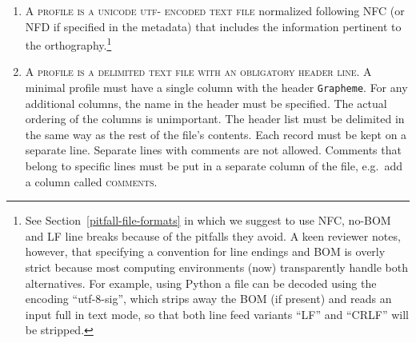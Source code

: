 \begin{enumerate}
	\def\labelenumi{A\arabic{enumi}.} 
	\item \textsc{A profile is a unicode utf-\scalebox{0.8}{8} encoded text file} 
	   normalized following NFC (or NFD if specified in the metadata)
       that includes the information pertinent to the orthography.\footnote{See 
	   Section~\ref{pitfall-file-formats} in which we suggest to use NFC, 
	   no-BOM and LF line breaks because of the pitfalls they avoid. A keen reviewer notes, however, that specifying 
	   a convention for line endings and BOM is overly strict because most 
	   computing environments (now) transparently handle both alternatives. 
	   For example, using Python a file can be decoded using the encoding 
	   ``utf-8-sig'', which strips away the BOM (if present) and reads 
	   an input full in text mode, so that both line feed variants ``LF'' and 
	   ``CRLF'' will be stripped.}

	\item \textsc{A profile is a delimited text file with an obligatory header
       line}. A minimal profile must have a single column with the header \texttt{Grapheme}. 
	   For any additional columns, the name in the header 
       must be specified. The actual ordering of the columns is unimportant. 
	   The header list must be delimited 
	   in the same way as the rest of the file's contents. Each record must be kept 
	   on a separate line. Separate lines with comments are not allowed. Comments that
       belong to specific lines must be put in a separate column of
       the file, e.g.~add a column called \textsc{comments}.

\begin{comment}	   
	\item \textsc{Metadata should be added in a separate utf-\scalebox{0.8}{8} text file} using a basic
       \textsc{tag: value} format. Metadata about the orthographic description
       given in the orthography profile includes, minimally, (i) author, (ii)
       date, (iii) title of the profile, (iv) a stable language identifier
       encoded in BCP 47/ISO 639-3 of the target language of the profile, and (v)
       bibliographic data for resource(s) that illustrate the orthography
       described in the profile. Further, (vi) the tokenization method and (vii)
       the Unicode normalization used should be documented here (see below).
\end{comment}


\end{enumerate}
